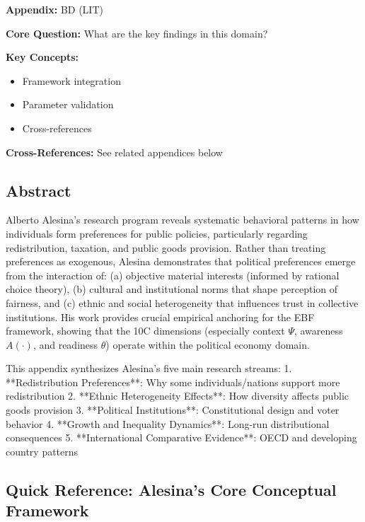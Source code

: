 \begin{tcolorbox}[colback=blue!5!white, colframe=blue!75!black,
    title=Quick Reference: Appendix BD]

\textbf{Appendix:} BD (LIT)

\textbf{Core Question:} What are the key findings in this domain?

\textbf{Key Concepts:}
\begin{itemize}[nosep]
\item Framework integration
\item Parameter validation
\item Cross-references
\end{itemize}

\textbf{Cross-References:} See related appendices below
\end{tcolorbox}

\label{app:lit-alesina}

\subsection*{Abstract}

Alberto Alesina's research program reveals systematic behavioral patterns in how individuals form preferences for public policies, particularly regarding redistribution, taxation, and public goods provision. Rather than treating preferences as exogenous, Alesina demonstrates that political preferences emerge from the interaction of: (a) objective material interests (informed by rational choice theory), (b) cultural and institutional norms that shape perception of fairness, and (c) ethnic and social heterogeneity that influences trust in collective institutions. His work provides crucial empirical anchoring for the EBF framework, showing that the 10C dimensions (especially context $\Psi$, awareness $A(\cdot)$, and readiness $\theta$) operate within the political economy domain.

This appendix synthesizes Alesina's five main research streams:
1. **Redistribution Preferences**: Why some individuals/nations support more redistribution
2. **Ethnic Heterogeneity Effects**: How diversity affects public goods provision
3. **Political Institutions**: Constitutional design and voter behavior
4. **Growth and Inequality Dynamics**: Long-run distributional consequences
5. **International Comparative Evidence**: OECD and developing country patterns

\subsection*{Quick Reference: Alesina's Core Conceptual Framework}

